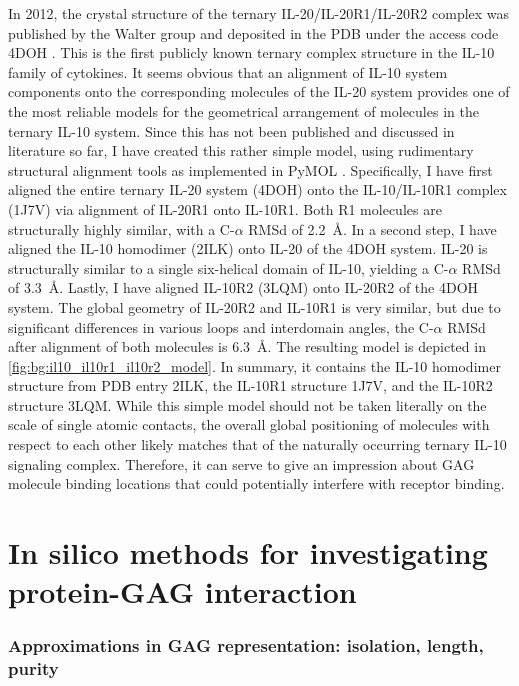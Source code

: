 In 2012, the crystal structure of the ternary IL-20/IL-20R1/IL-20R2 complex was
published by the Walter group and deposited in the PDB under the access code
4DOH \cite{logsdon_il20r2compl_2012}. This is the first publicly known ternary
complex structure in the IL-10 family of cytokines. It seems obvious that an
alignment of IL-10 system components onto the corresponding molecules of the
IL-20 system provides one of the most reliable models for the geometrical
arrangement of molecules in the ternary IL-10 system. Since this has not been
published and discussed in literature so far, I have created this rather simple
model, using rudimentary structural alignment tools as implemented in PyMOL
\cite{pymol}. Specifically, I have first aligned the entire ternary IL-20 system
(4DOH) onto the IL-10/IL-10R1 complex (1J7V) via alignment of IL-20R1 onto
IL-10R1. Both R1 molecules are structurally highly similar, with a C-$\alpha$
RMSd of \SI{2.2}{\angstrom}. In a second step, I have aligned the IL-10
homodimer (2ILK) onto IL-20 of the 4DOH system. IL-20 is structurally similar to
a single six-helical domain of IL-10, yielding a C-$\alpha$ RMSd of
\SI{3.3}{\angstrom}. Lastly, I have aligned IL-10R2 (3LQM) onto IL-20R2 of the
4DOH system. The global geometry of IL-20R2 and IL-10R1 is very similar, but due
to significant differences in various loops and interdomain angles, the
C-$\alpha$ RMSd after alignment of both molecules is \SI{6.3}{\angstrom}. The
resulting model is depicted in \cref{fig:bg:il10_il10r1_il10r2_model}. In
summary, it contains the IL-10 homodimer structure from PDB entry 2ILK, the
IL-10R1 structure 1J7V, and the IL-10R2 structure 3LQM. While this simple model
should not be taken literally on the scale of single atomic contacts, the
overall global positioning of molecules with respect to each other likely
matches that of the naturally occurring ternary IL-10 signaling complex.
Therefore, it can serve to give an impression about GAG molecule binding
locations that could potentially interfere with receptor binding.


\section{In silico methods for investigating protein-GAG interaction}

\subsubsection{Approximations in GAG representation: isolation, length, purity}


